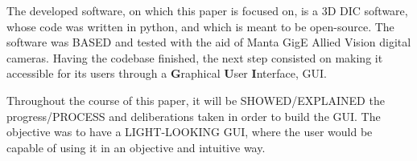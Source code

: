 The developed software, on which this paper is focused on, is a 3D DIC software, whose code was written in python, and which is meant to be open-source. The software was BASED and tested with the aid of Manta GigE Allied Vision digital cameras. %
Having the codebase finished, the next step consisted on making it accessible for its users through a \textbf{G}raphical \textbf{U}ser \textbf{I}nterface, GUI.

Throughout the course of this paper, it will be SHOWED/EXPLAINED the progress/PROCESS and deliberations taken in order to build the GUI. The objective was to have a LIGHT-LOOKING GUI, where the user would be capable of using it in an objective and intuitive way.









